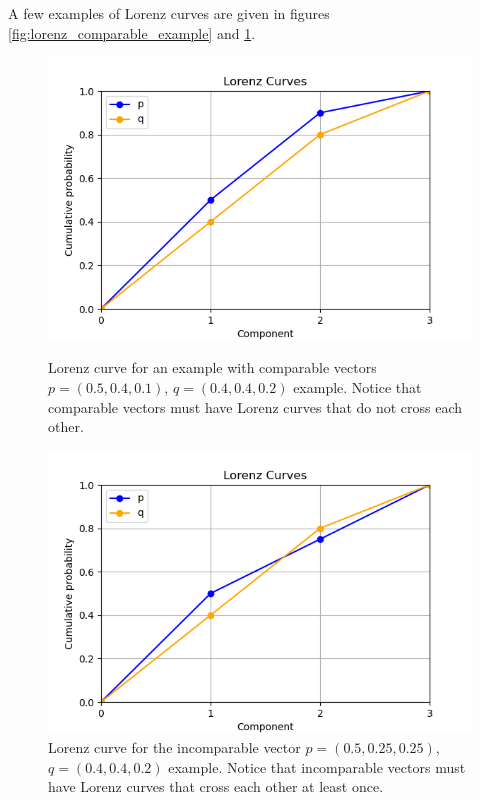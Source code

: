 A few examples of Lorenz curves are given in figures \ref{fig:lorenz_comparable_example} and \ref{fig:lorenz_incomparable_example}.

\begin{figure}[h!]
    \centering
    \begin{minipage}{.48\textwidth}
        \centering
        \includegraphics[scale=0.45]{images/lorenz_comp.png}
        \caption{Lorenz curve for an example with comparable vectors $p = (0.5, 0.4, 0.1)$, $q = (0.4, 0.4, 0.2)$ example. Notice that comparable vectors must have Lorenz curves that do not cross each other.}
        \label{fig:lorenz_comparable_example}
    \end{minipage}
    \hfill
    \begin{minipage}{0.48\textwidth}
        \centering
        \includegraphics[scale=0.45]{images/lorenz_incomp.png}
        \caption{Lorenz curve for the incomparable vector $p = (0.5, 0.25, 0.25)$, $q = (0.4, 0.4, 0.2)$ example. Notice that incomparable vectors must have Lorenz curves that cross each other at least once.}
        \label{fig:lorenz_incomparable_example}
    \end{minipage}
\end{figure}

